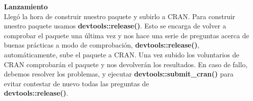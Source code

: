\textbf{Lanzamiento}\\
Lleg\'o la hora de construir nuestro paquete y subirlo a CRAN. Para construir nuestro paquete
usamos \textbf{devtools::release()}. Esto se encarga de volver a comprobar el paquete una \'ultima
vez y nos hace una serie de preguntas acerca de buenas pr\'acticas a modo de comprobaci\'on,
\textbf{devtools::release()}, autom\'aticamente, sube el paquete a CRAN.
Una vez subido los voluntarios de CRAN comprobar\'an el paquete y nos
devolver\'an los resultados.
En caso de fallo, debemos resolver los problemas, y ejecutar \textbf{devtools::submit\_cran()} para evitar contestar de nuevo todas las preguntas de \\
\textbf{devtools::release()}.

\newpage